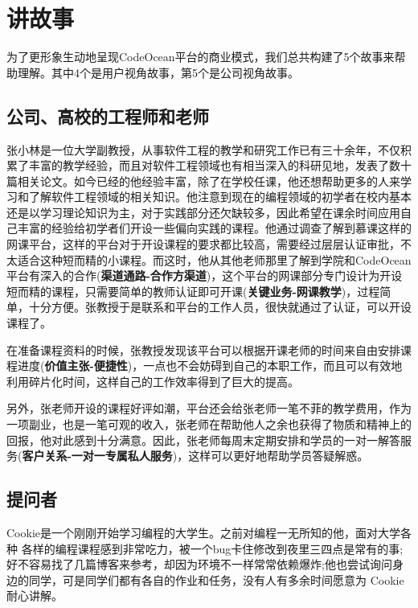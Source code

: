 \documentclass[a4paper]{ctexart}
\begin{document}
\section{讲故事}
为了更形象生动地呈现CodeOcean平台的商业模式，我们总共构建了5个故事来帮助理解。其中4个是用户视角故事，第5个是公司视角故事。

\subsection{公司、高校的工程师和老师}
张小林是一位大学副教授，从事软件工程的教学和研究工作已有三十余年，不仅积累了丰富的教学经验，而且对软件工程领域也有相当深入的科研见地，发表了数十篇相关论文。如今已经的他经验丰富，除了在学校任课，他还想帮助更多的人来学习和了解软件工程领域的相关知识。他注意到现在的编程领域的初学者在校内基本还是以学习理论知识为主，对于实践部分还欠缺较多，因此希望在课余时间应用自己丰富的经验给初学者们开设一些偏向实践的课程。他通过调查了解到慕课这样的网课平台，这样的平台对于开设课程的要求都比较高，需要经过层层认证审批，不太适合这种短而精的小课程。而这时，他从其他老师那里了解到学院和CodeOcean平台有深入的合作(\textbf{渠道通路-合作方渠道})，这个平台的网课部分专门设计为开设短而精的课程，只需要简单的教师认证即可开课(\textbf{关键业务-网课教学})，过程简单，十分方便。张教授于是联系和平台的工作人员，很快就通过了认证，可以开设课程了。

在准备课程资料的时候，张教授发现该平台可以根据开课老师的时间来自由安排课程进度(\textbf{价值主张-便捷性})，一点也不会妨碍到自己的本职工作，而且可以有效地利用碎片化时间，这样自己的工作效率得到了巨大的提高。

另外，张老师开设的课程好评如潮，平台还会给张老师一笔不菲的教学费用，作为一项副业，也是一笔可观的收入，张老师在帮助他人之余也获得了物质和精神上的回报，他对此感到十分满意。因此，张老师每周末定期安排和学员的一对一解答服务(\textbf{客户关系-一对一专属私人服务})，这样可以更好地帮助学员答疑解惑。

\subsection{提问者}
Cookie是一个刚刚开始学习编程的大学生。之前对编程一无所知的他，面对大学各种 各样的编程课程感到非常吃力，被一个bug卡住修改到夜里三四点是常有的事;好不容易找了几篇博客来参考，却因为环境不一样常常依赖爆炸;他也尝试询问身边的同学，可是同学们都有各自的作业和任务，没有人有多余时间愿意为 Cookie 耐心讲解。
\end{document}

